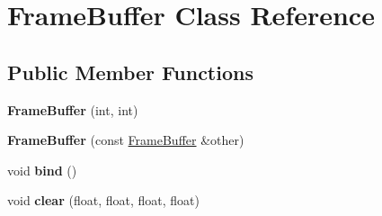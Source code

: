 \hypertarget{classFrameBuffer}{\section{Frame\-Buffer Class Reference}
\label{classFrameBuffer}
}
\subsection*{Public Member Functions}
\begin{DoxyCompactItemize}
\item 
\hypertarget{classFrameBuffer_ae6d613ed1eb12f6f02312f520362c22f}{{\bfseries Frame\-Buffer} (int, int)}\label{classFrameBuffer_ae6d613ed1eb12f6f02312f520362c22f}

\item 
\hypertarget{classFrameBuffer_ac22e3f2314044538ccef5dd5fd747646}{{\bfseries Frame\-Buffer} (const \hyperlink{classFrameBuffer}{Frame\-Buffer} \&other)}\label{classFrameBuffer_ac22e3f2314044538ccef5dd5fd747646}

\item 
\hypertarget{classFrameBuffer_a16fa30984714c6070f4c5bde5b5b87f7}{void {\bfseries bind} ()}\label{classFrameBuffer_a16fa30984714c6070f4c5bde5b5b87f7}

\item 
\hypertarget{classFrameBuffer_a7ce56c91751d69637c46ba584dfde41c}{void {\bfseries clear} (float, float, float, float)}\label{classFrameBuffer_a7ce56c91751d69637c46ba584dfde41c}

\end{DoxyCompactItemize}
